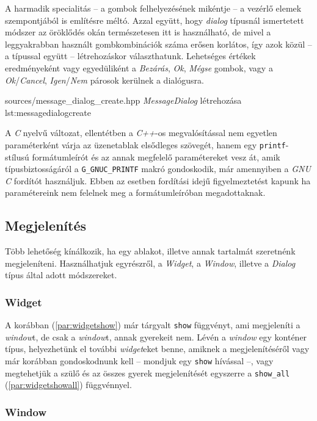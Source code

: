 A harmadik specialitás -- a gombok felhelyezésének mikéntje -- a vezérlő elemek szempontjából is említésre méltó. Azzal együtt, hogy \textit{dialog} típusnál ismertetett módszer az öröklődés okán természetesen itt is használható, de mivel a leggyakrabban használt gombkombinációk száma erősen korlátos, így azok közül -- a típussal együtt -- létrehozáskor választhatunk. Lehetséges értékek eredményeként vagy egyedüliként a \textit{Bezárás}, \textit{Ok}, \textit{Mégse} gombok, vagy a \textit{Ok}/\textit{Cancel}, \textit{Igen}/\textit{Nem} párosok kerülnek a dialógusra.

{sources/message_dialog_create.hpp}
{\textit{MessageDialog} létrehozása}
{lst:messagedialogcreate}


A \textit{C} nyelvű változat, ellentétben a \textit{C++}-os megvalósítással nem egyetlen paraméterként várja az üzenetablak elsődleges szövegét, hanem egy \texttt{printf}-stílusú formátumleírót és az annak megfelelő paramétereket vesz át, amik típusbiztosságáról a \texttt{G\_GNUC\_PRINTF} makró gondoskodik, már amennyiben a \textit{GNU C} fordítót használjuk. Ebben az esetben fordítási idejű figyelmeztetést kapunk ha paramétereink nem felelnek meg a formátumleíróban megadottaknak.

\subsection{Megjelenítés}

Több lehetőség kínálkozik, ha egy ablakot, illetve annak tartalmát szeretnénk megjeleníteni. Használhatjuk egyrészről, a \textit{Widget}, a \textit{Window}, illetve a \textit{Dialog} típus által adott módszereket.

\subsubsection{Widget}

A korábban (\ref{par:widgetshow}) már tárgyalt \texttt{show} függvényt, ami megjeleníti a \textit{window}t, de csak a \textit{window}t, annak gyerekeit nem. Lévén a \textit{window} egy konténer típus, helyezhetünk el további \textit{widget}eket benne, amiknek a megjelenítéséről vagy már korábban gondoskodnunk kell -- mondjuk egy \texttt{show} hívással --, vagy megtehetjük a szülő és az összes gyerek megjelenítését egyszerre a \texttt{show\_all} (\ref{par:widgetshowall}) függvénnyel.

\subsubsection{Window}

